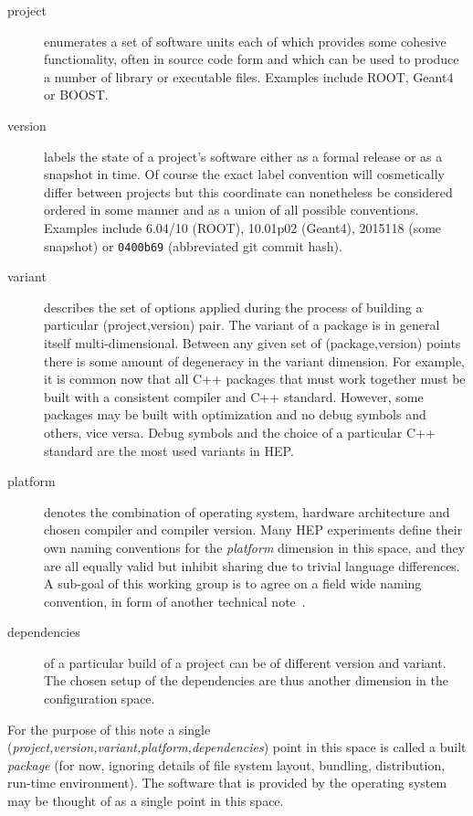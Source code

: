 \documentclass[12pt,a4paper]{article}
\begin{document}
\begin{description}

\item[project] enumerates a set of software units each of which provides
some cohesive functionality, often in source code form and which can be
used to produce a number of library or executable files.  Examples
include ROOT, Geant4 or BOOST.

\item[version] labels the state of a project's software either as a
formal release or as a snapshot in time.  Of course the exact label
convention will cosmetically differ between projects but this coordinate
can nonetheless be considered ordered in some manner and as a union of
all possible conventions.  Examples include 6.04/10 (ROOT), 10.01p02
(Geant4), 2015118 (some snapshot) or \texttt{0400b69} (abbreviated git
commit hash).

\item[variant] describes the set of options applied during the process
of building a particular (project,version) pair.  The variant of a
package is in general itself multi-dimensional.  Between any given set
of (package,version) points there is some amount of degeneracy in the
variant dimension.  For example, it is common now that all C++ packages
that must work together must be built with a consistent compiler and C++
standard.  However, some packages may be built with optimization and no
debug symbols and others, vice versa. Debug symbols and the choice of a
particular C++ standard are the most used variants in HEP.

\item[platform] denotes the combination of operating system, hardware
architecture and chosen compiler and compiler version. Many HEP experiments
define their own naming conventions for the \textit{platform} dimension in this
space, and they are all equally valid but inhibit sharing due to trivial
language differences.  A sub-goal of this working group is to agree on a field
wide naming convention, in form of another technical
note~\cite{naming-conventions}.

\item[dependencies] of a particular build of a project can be of different
version and variant. The chosen setup of the dependencies are thus
another dimension in the configuration space.

\end{description}

For the purpose of this note a single (\textit{project,version,variant,platform,dependencies})
point in this space is called a built \textit{package} (for now, ignoring details of file
system layout, bundling, distribution, run-time environment).  The
software that is provided by the operating system may be thought of as a
single point in this space.
\end{document}

